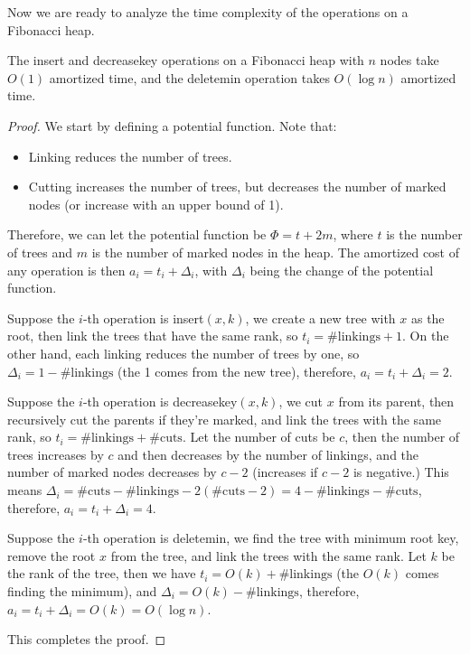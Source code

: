 Now we are ready to analyze the time complexity of the operations on a Fibonacci heap.

\begin{theorem}
	The insert and decreasekey operations on a Fibonacci heap with $n$ nodes take $O(1)$ amortized time, and the deletemin operation takes $O(\log n)$ amortized time.
\end{theorem}
\begin{proof}
	We start by defining a potential function. Note that:
	\begin{itemize}
		\item Linking reduces the number of trees.
		\item Cutting increases the number of trees, but decreases the number of marked nodes (or increase with an upper bound of 1).
	\end{itemize}
	Therefore, we can let the potential function be $\Phi = t + 2m$, where $t$ is the number of trees and $m$ is the number of marked nodes in the heap. The amortized cost of any operation is then $a_i = t_i + \Delta_i$, with $\Delta_i$ being the change of the potential function.

	Suppose the $i$-th operation is insert$(x,k)$, we create a new tree with $x$ as the root, then link the trees that have the same rank, so $t_i = \text{\# linkings} + 1$. On the other hand, each linking reduces the number of trees by one, so $\Delta_i = 1 - \text{\# linkings}$ (the 1 comes from the new tree), therefore, $a_i = t_i + \Delta_i = 2$.

	Suppose the $i$-th operation is decreasekey$(x,k)$, we cut $x$ from its parent, then recursively cut the parents if they're marked, and link the trees with the same rank, so $t_i = \text{\# linkings} + \text{\# cuts}$. Let the number of cuts be $c$, then the number of trees increases by $c$ and then decreases by the number of linkings, and the number of marked nodes decreases by $c-2$ (increases if $c-2$ is negative.) This means $\Delta_i = \text{\# cuts} - \text{\# linkings} - 2(\text{\# cuts} - 2) = 4 - \text{\# linkings} - \text{\# cuts}$, therefore, $a_i = t_i + \Delta_i = 4$.

	Suppose the $i$-th operation is deletemin, we find the tree with minimum root key, remove the root $x$ from the tree, and link the trees with the same rank. Let $k$ be the rank of the tree, then we have $t_i = O(k) + \text{\# linkings}$ (the $O(k)$ comes finding the minimum), and $\Delta_i = O(k) - \text{\# linkings}$, therefore, $a_i = t_i + \Delta_i = O(k) = O(\log n)$.

	This completes the proof.
\end{proof}

































